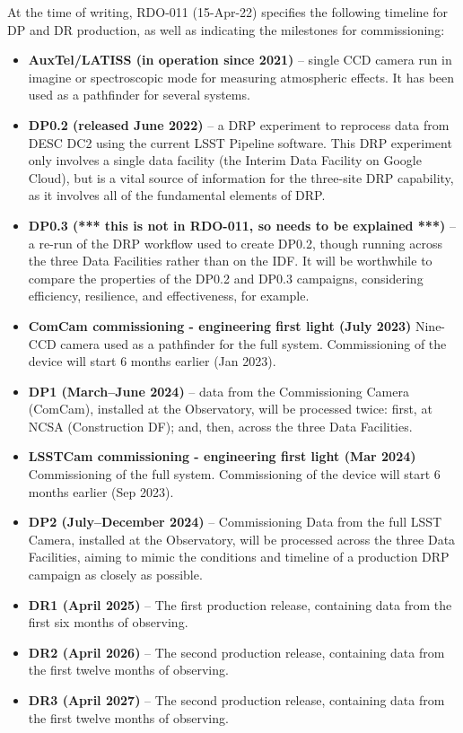 At the time of writing, RDO-011 (15-Apr-22) specifies the following
timeline for DP and DR production, as well as indicating the
milestones for commissioning:

\begin{itemize}

\item {\bf AuxTel/LATISS (in operation since 2021)} -- single CCD
  camera run in imagine or spectroscopic mode for measuring
  atmospheric effects. It has been used as a pathfinder for several systems.
  
\item {\bf DP0.2 (released June 2022)} -- a DRP experiment to reprocess data from DESC DC2 using the current LSST Pipeline software. This DRP experiment only involves a single data facility (the Interim Data Facility on Google Cloud), but is a vital source of information for the three-site DRP capability, as it involves all of the fundamental elements of DRP.
  
\item {\bf DP0.3 (*** this is not in RDO-011, so needs to be explained ***)} -- a re-run of the DRP workflow used to create DP0.2, though running across the three Data Facilities rather than on the IDF. It will be worthwhile to compare the properties of the DP0.2 and DP0.3 campaigns, considering efficiency, resilience, and effectiveness, for example.

\item{\bf ComCam commissioning - engineering first light (July 2023)}
  Nine-CCD camera used as a pathfinder for the full
  system. Commissioning of the device will start 6 months earlier (Jan 2023).
  
\item {\bf DP1 (March--June 2024)} -- data from the Commissioning Camera (ComCam), installed at the Observatory, will be processed twice: first, at NCSA (Construction DF); and, then, across the three Data Facilities.

 \item{\bf LSSTCam commissioning - engineering first light (Mar 2024)}
 Commissioning of the full
  system. Commissioning of the device will start 6 months earlier (Sep
  2023).
  
\item {\bf DP2 (July--December 2024)} – Commissioning Data from the full LSST Camera, installed at the Observatory, will be processed across the three Data Facilities, aiming to mimic the conditions and timeline of a production DRP campaign as closely as possible.

\item {\bf DR1 (April 2025)} -- The first production release, containing data from the first six months of observing.
  
\item {\bf DR2 (April 2026)} -- The second production release, containing data from the first twelve months of observing.
  
\item {\bf DR3 (April 2027)} -- The second production release, containing data from the first twelve months of observing.
  
\end{itemize}

